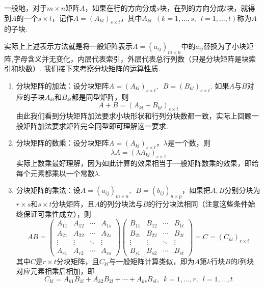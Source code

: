 \begin{definition}
    一般地，对于$m \times n$矩阵$A$，如果在行的方向分成$s$块，在列的方向分成$t$块，就得到$A$的一个$s \times t$，记作$A=(A_{kl})_{s \times t}$，其中$A_{kl}\enspace(k=1,\ldots,s,\enspace l=1,\ldots,t)$称为$A$的子块.
\end{definition}
实际上上述表示方法就是将一般矩阵表示$A=(a_{ij})_{m \times n}$中的$a_{ij}$替换为了小块矩阵,字母含义并无变化，内层代表索引，外层代表总行列数（只是分块矩阵是块索引和块数）. 我们接下来考察分块矩阵的运算性质.
\begin{enumerate}
    \item 分块矩阵的加法：设分块矩阵$A=(A_{kl})_{s \times t},\enspace B=(B_{kl})_{s \times t}$. 如果$A$与$B$对应的子块$A_{kl}$和$B_{kl}$都是同型矩阵，则
          \[A+B=(A_{kl}+B_{kl})_{s \times t}\]
          由此我们看到分块矩阵加法要求小块形状和行列分块数都一致，实际上回顾一般矩阵加法要求矩阵完全同型即可理解这一要求.

    \item 分块矩阵的数乘：设分块矩阵$A=(A_{kl})_{s \times t}$，$\lambda$是一个数，则
          \[\lambda A=(\lambda A_{kl})_{s \times t}\]
          实际上数乘最好理解，因为如此计算的效果相当于一般矩阵数乘的效果，即给每个元素都乘以一个常数$\lambda$.

    \item 分块矩阵的乘法：设$A=(a_{ij})_{m \times n},\enspace B=(b_{ij})_{n \times p}$，如果把$A,B$分别分块为$r \times s$和$s \times t$分块矩阵，且$A$的列分块法与$B$的行分块法相同（注意这些条件始终保证可乘性成立），则
          \[AB=\begin{pmatrix}
                  A_{11} & A_{12} & \cdots & A_{1s} \\
                  A_{21} & A_{22} & \cdots & A_{2s} \\
                  \vdots & \vdots & \ddots & \vdots \\
                  A_{r1} & A_{r2} & \cdots & A_{rs}
              \end{pmatrix}\begin{pmatrix}
                  B_{11} & B_{12} & \cdots & B_{1t} \\
                  B_{21} & B_{22} & \cdots & B_{2t} \\
                  \vdots & \vdots & \ddots & \vdots \\
                  B_{s1} & B_{s2} & \cdots & B_{st}
              \end{pmatrix}=C=(C_{kl})_{r \times t}\]
          其中$C$是$r \times t$分块矩阵，且$C_{kl}$与一般矩阵计算类似，即为$A$第$k$行块$B$的$l$列块对应元素相乘后相加，即
          \[C_{kl}=A_{k1}B_{1l}+A_{k2}B_{2l}+\cdots+A_{ks}B_{sl},\enspace k=1,\ldots,r,\enspace l=1,\ldots,t\]


\end{enumerate}
